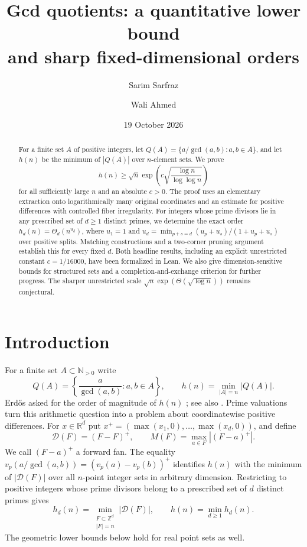 \documentclass[11pt]{amsart}
\title[Gcd quotients]{Gcd quotients: a quantitative lower bound\\ and sharp fixed-dimensional orders}
\author{Sarim Sarfraz}
\author{Wali Ahmed}
\date{19 October 2026}
\theoremstyle{definition}
\theoremstyle{remark}
\newcommand{\R}{\mathbb{R}}
\newcommand{\Z}{\mathbb{Z}}
\newcommand{\N}{\mathbb{N}}
\newcommand{\Dp}{\mathcal{D}}
\begin{document}
\begin{abstract}
For a finite set $A$ of positive integers, let $Q(A)=\{a/\gcd(a,b):a,b\in A\}$, and let $h(n)$ be the minimum of $|Q(A)|$ over $n$-element sets. We prove
\[
h(n)\ge\sqrt n\exp\!\left(c\sqrt{\frac{\log n}{\log\log n}}\right)
\]
for all sufficiently large $n$ and an absolute $c>0$. The proof uses an elementary extraction onto logarithmically many original coordinates and an estimate for positive differences with controlled fiber irregularity. For integers whose prime divisors lie in any prescribed set of $d\ge1$ distinct primes, we determine the exact order $h_d(n)=\Theta_d(n^{u_d})$, where $u_1=1$ and $u_d=\min_{p+s=d}(u_p+u_s)/(1+u_p+u_s)$ over positive splits. Matching constructions and a two-corner pruning argument establish this for every fixed $d$. Both headline results, including an explicit unrestricted constant $c=1/16000$, have been formalized in Lean. We also give dimension-sensitive bounds for structured sets and a completion-and-exchange criterion for further progress. The sharper unrestricted scale $\sqrt n\exp(\Theta(\sqrt{\log n}))$ remains conjectural.
\end{abstract}

\maketitle

\section{Introduction}
For a finite set $A\subset\N_{>0}$ write
\[
Q(A)=\left\{\frac{a}{\gcd(a,b)}:a,b\in A\right\},
\qquad h(n)=\min_{|A|=n}|Q(A)|.
\]
Erd\H{o}s asked for the order of magnitude of $h(n)$ \cite[Section~5, p.~125]{Er73}; see also \cite{EP539}. Prime valuations turn this arithmetic question into a problem about coordinatewise positive differences. For $x\in\R^d$ put $x^+=(\max(x_1,0),\ldots,\max(x_d,0))$, and define
\[
\Dp(F)=(F-F)^+,\qquad
M(F)=\max_{a\in F}|(F-a)^+|.
\]
We call $(F-a)^+$ a forward fan. The equality
$v_p(a/\gcd(a,b))=(v_p(a)-v_p(b))^+$ identifies $h(n)$ with the minimum of $|\Dp(F)|$ over all $n$-point integer sets in arbitrary dimension. Restricting to positive integers whose prime divisors belong to a prescribed set of $d$ distinct primes gives
\[
h_d(n)=\min_{\substack{F\subset\Z^d\\|F|=n}}|\Dp(F)|,
\qquad h(n)=\min_{d\ge1}h_d(n).
\]
The geometric lower bounds below hold for real point sets as well.
\end{document}
